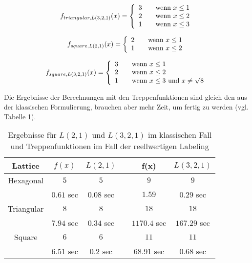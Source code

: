\documentclass[
	fontsize=12pt,
	paper=a4,
	twoside=false,
	numbers=noenddot,
	plainheadsepline,
	toc=listof,
	toc=bibliography
]{scrartcl}
\begin{document}
\[ f_{triangular,L(3,2,1)}(x) = \left\{
  \begin{array}{l l}
    3 & \quad \text{wenn $x\le 1$}\\
    2 & \quad \text{wenn $x\le 2$}\\
    1 & \quad \text{wenn $x\le 3$}
  \end{array} \right.\]

\[ f_{square,L(2,1)}(x) = \left\{
  \begin{array}{l l}
    2 & \quad \text{wenn $x\le 1$}\\
    1 & \quad \text{wenn $x\le 2$}
  \end{array} \right.\]

\[ f_{square,L(3,2,1)}(x) = \left\{
  \begin{array}{l l}
    3 & \quad \text{wenn $x\le 1$}\\
    2 & \quad \text{wenn $x\le 2$}\\
    1 & \quad \text{wenn $x\le 3$ und $x\neq\sqrt{8}$}
  \end{array} \right.\]

Die Ergebnisse der Berechnungen mit den Treppenfunktionen sind gleich den aus der klassischen Formulierung, brauchen aber mehr Zeit, um fertig zu werden (vgl. Tabelle \ref{Table3}).

\begin{table}[htbp]
\centering
  \begin{tabular}{|c|c|c|c|c|c|}
    \hline
    Lattice& $f(x)$  & $L(2,1)$ & & f(x) & $L(3,2,1)$ \\ \hline
    Hexagonal	& $5$ & $5$ & & $9$ & $9$ \\
			& $0.61$ sec	& $0.08$ sec & & $1.59$ & $0.29$ sec\\ \hline
    Triangular	& $8$ & $8$ & & $18$ &  $18$\\
			& $7.94$ sec & $0.34$ sec & & $1170.4$ sec & $167.29$ sec \\ \hline
    Square	& $6$ & $6$ & & $11$ & $11$\\
			& $6.51$ sec & $0.2$ sec & & $68.91$ sec & $0.68$ sec\\   \hline
  \end{tabular}
\caption{Ergebnisse für $L(2,1)$ und $L(3,2,1)$ im klassischen Fall und Treppenfunktionen im Fall der reellwertigen Labeling}
\label{Table3}
\end{table}
\end{document}
